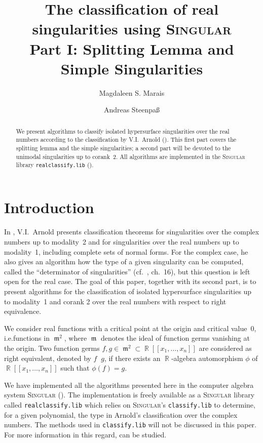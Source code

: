\documentclass[noend]{amsproc}
\title[The classification of real singularities using \textsc{Singular}, %
Part I]%
{The classification of real singularities using \textsc{Singular}\\
Part I: Splitting Lemma and Simple Singularities}
\author{Magdaleen S. Marais}
\author{Andreas Steenpa\ss}
\theoremstyle{definition}
\newcommand{\Singular}{\textsc{Singular}}
\newcommand{\realclassify}{\texttt{realclassify.lib}}
\newcommand{\classify}{\texttt{classify.lib}}
\DeclareMathOperator{\requiv}{\overset{r}{\sim}}
\DeclareMathOperator{\m}{\mathfrak{m}}
\DeclareMathOperator{\R}{\mathbb{R}}
\begin{document}
\begin{abstract}
We present algorithms to classify isolated hypersurface singularities over the
real numbers according to the classification by V.I.~Arnold (\cite{AVG1985}).
This first part covers the splitting lemma and the simple singularities; a
second part will be devoted to the unimodal singularities up to corank~2.
All algorithms are implemented in the \Singular{} library \realclassify{}
(\cite{realclassify}).
\end{abstract}

\maketitle


\section{Introduction}
In \cite{AVG1985}, V.I.~Arnold presents classification theorems for
singularities over the complex numbers up to modality~2 and for singularities
over the real numbers up to modality~1, including complete sets of normal
forms. For the complex case, he also gives an algorithm how the type of a given
singularity can be computed, called the ``determinator of singularities''
(cf.~\cite{AVG1985}, ch.~16), but this question is left open for the real case.
The goal of this paper, together with its second part, is to present algorithms
for the classification of isolated hypersurface singularities up to modality~1
and corank 2 over the real numbers with respect to right equivalence.

We consider real functions with a critical point at the origin and critical
value~$0$, i.e.\@ functions in $\m^2$, where $\m$ denotes the ideal of function
germs vanishing at the origin. Two function germs $f, g \in \m^2 \subset
\R[[x_1,\ldots,x_n]]$ are considered as right equivalent, denoted by
$f \requiv g$, if there exists an $\R$-algebra automorphism $\phi$ of
$\R[[x_1,\ldots,x_n]]$ such that $\phi(f) = g$.

We have implemented all the algorithms presented here in the computer algebra
system \Singular{} (\cite{DGPS}). The implementation is freely available as a
\Singular{} library called \realclassify{} which relies on \Singular's
\classify{} to determine, for a given polynomial, the type in Arnold's
classification over the complex numbers. The methods used in \classify{} will
not be discussed in this paper. For more information in this regard,
\cite{Kruger} can be studied.
\end{document}
